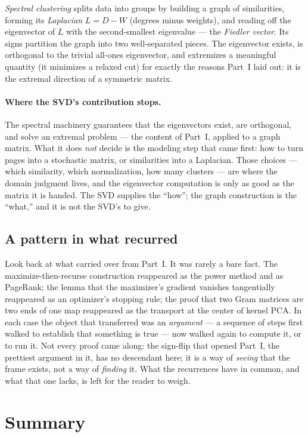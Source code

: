 \documentclass[11pt]{article}
\numberwithin{equation}{section}
\theoremstyle{plainish}
\begin{document}
\emph{Spectral clustering} splits data into groups by building a graph of
similarities, forming its \emph{Laplacian} $L = D - W$ (degrees minus
weights), and reading off the eigenvector of $L$ with the second-smallest
eigenvalue --- the \emph{Fiedler vector}. Its signs partition the graph into two
well-separated pieces. The eigenvector exists, is orthogonal to the trivial
all-ones eigenvector, and extremizes a meaningful quantity (it minimizes a
relaxed cut) for exactly the reasons Part~I laid out: it is the extremal
direction of a symmetric matrix.

\paragraph{Where the SVD's contribution stops.} The spectral machinery guarantees
that the eigenvectors exist, are orthogonal, and solve an extremal problem --- the
content of Part~I, applied to a graph matrix. What it does \emph{not} decide is
the modeling step that came first: how to turn pages into a stochastic matrix, or
similarities into a Laplacian. Those choices --- which similarity, which
normalization, how many clusters --- are where the domain judgment lives, and the
eigenvector computation is only as good as the matrix it is handed. The SVD
supplies the ``how''; the graph construction is the ``what,'' and it is not the
SVD's to give.

\subsection*{A pattern in what recurred}

Look back at what carried over from Part~I. It was rarely a bare fact. The
maximize-then-recurse construction reappeared as the power method and as
PageRank; the lemma that the maximizer's gradient vanishes tangentially
reappeared as an optimizer's stopping rule; the proof that two Gram matrices are
two ends of one map reappeared as the transport at the center of kernel PCA. In
each case the object that transferred was an \emph{argument} --- a sequence of
steps first walked to establish that something is true --- now walked again to
compute it, or to run it. Not every proof came along: the sign-flip that opened
Part~I, the prettiest argument in it, has no descendant here; it is a way of
\emph{seeing} that the frame exists, not a way of \emph{finding} it. What the
recurrences have in common, and what that one lacks, is left for the reader to
weigh.

\section{Summary}
\end{document}

